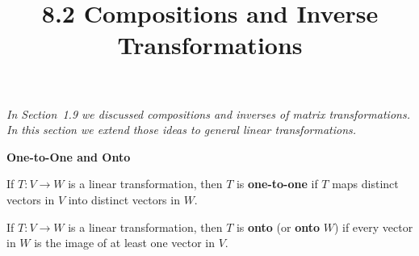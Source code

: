\documentclass{article}
\title{8.2 Compositions and Inverse Transformations}
\date{}
\author{}
\newcommand{\redheading}[1]{{\vspace{2mm}\noindent\Large\bfseries\color{red!55!black} #1\par}\vspace{2mm}}
\begin{document}
\maketitle

{\itshape\color{blue!45!black}
In Section~1.9 we discussed compositions and inverses of matrix transformations. In this
section we extend those ideas to general linear transformations.\par}

\vspace{2mm}

\redheading{One-to-One and Onto}

\begin{tcolorbox}[colback=teal!4, colframe=teal!65!black,
  title={\textbf{Definition 1}}, boxrule=0.5mm, arc=3mm]
If $T : V \to W$ is a linear transformation, then $T$ is \textbf{one-to-one} if $T$
maps distinct vectors in $V$ into distinct vectors in $W$.
\end{tcolorbox}

\begin{tcolorbox}[colback=teal!4, colframe=teal!65!black,
  title={\textbf{Definition 2}}, boxrule=0.5mm, arc=3mm]
If $T : V \to W$ is a linear transformation, then $T$ is \textbf{onto} (or \textbf{onto}
$W$) if every vector in $W$ is the image of at least one vector in $V$.
\end{tcolorbox}
\end{document}
